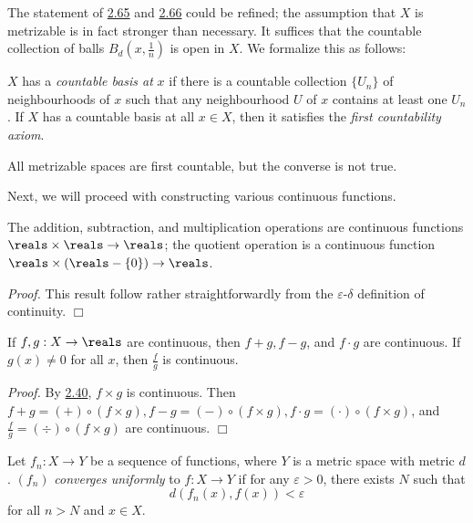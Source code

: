 The statement of \hyperref[2.65]{2.65} and \hyperref[2.66]{2.66} could be refined; the assumption that $X$ is metrizable is in fact stronger than necessary. It suffices that the countable collection of balls $B_d(x, \frac1n)$ is open in $X$. We formalize this as follows:
\begin{definition}\label{2.67}
    $X$ has a {\it countable basis at} $x$ if there is a countable collection $\{U_n\}$ of neighbourhoods of $x$ such that any neighbourhood $U$ of $x$ contains at least one $U_n$. If $X$ has a countable basis at all $x \in X$, then it satisfies the {\it first countability axiom}.
\end{definition}
All metrizable spaces are first countable, but the converse is not true.

Next, we will proceed with constructing various continuous functions.
\begin{lemma}\label{2.68}
    The addition, subtraction, and multiplication operations are continuous functions $\reals \times \reals \rightarrow \reals$; the quotient operation is a continuous function $\reals \times (\reals - \{0\}) \rightarrow \reals$.
\end{lemma}
{\it Proof.} This result follow rather straightforwardly from the $\varepsilon$-$\delta$ definition of continuity. $\Box$

\begin{theorem}\label{2.69}
    If $f, g: X \rightarrow \reals$ are continuous, then $f+g, f-g$, and $f\cdot g$ are continuous. If $g(x) \neq 0$ for all $x$, then $\frac{f}{g}$ is continuous.
\end{theorem}
{\it Proof.} By \hyperref[2.40]{2.40}, $f \times g$ is continuous. Then $f + g = (+) \circ (f \times g), f - g = (-) \circ (f \times g), f \cdot g = (\cdot) \circ (f \times g)$, and $\frac{f}{g} = (\div) \circ (f \times g)$ are continuous. $\Box$

\begin{definition}\label{2.70}
    Let $f_n:X \rightarrow Y$ be a sequence of functions, where $Y$ is a metric space with metric $d$. $(f_n)$ {\it converges uniformly} to $f: X \rightarrow Y$ if for any $\varepsilon > 0$, there exists $N$ such that
    $$d(f_n(x), f(x)) < \varepsilon$$
    for all $n> N$ and $x \in X$.
\end{definition}

